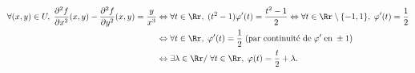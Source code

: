 {{\begin{align*}\ensuremath
\forall(x,y)\in U,\;\frac{\partial^2f}{\partial x^2}(x,y)-\frac{\partial^2f}{\partial y^2}(x,y)=\frac{y}{x^3}&\Leftrightarrow\forall t\in\Rr,\;(t^2-1)\varphi'(t)=\frac{t^2-1}{2}\Leftrightarrow\forall t\in\Rr\setminus\{-1,1\},\;\varphi'(t)=\frac{1}{2}\\
 &\Leftrightarrow\forall t\in\Rr,\;\varphi'(t)=\frac{1}{2}\;(\text{par continuité de}\;\varphi'\;\text{en}\;\pm1)\\
 &\Leftrightarrow\exists\lambda\in\Rr/\;\forall t\in\Rr,\;\varphi(t)=\frac{t}{2}+\lambda.
\end{align*}}
}